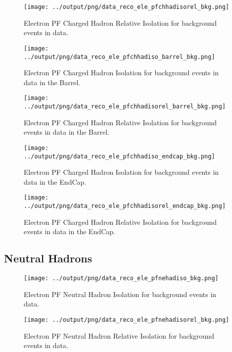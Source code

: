 \documentclass[11pt]{book}
\begin{document}
\begin{figure}[htb]
\centering
\texttt{[image: ../output/png/data\_reco\_ele\_pfchhadisorel\_bkg.png]}
\caption{Electron PF Charged Hadron Relative Isolation for background events in data.}
\label{fig:data_ele_pfchhadisorel_bkg}
\end{figure}

\begin{figure}[htb]
\centering
\texttt{[image: ../output/png/data\_reco\_ele\_pfchhadiso\_barrel\_bkg.png]}
\caption{Electron PF Charged Hadron Isolation for background events in data in the Barrel.}
\label{fig:data_ele_pfchhadiso_barrel_bkg}
\end{figure}

\begin{figure}[htb]
\centering
\texttt{[image: ../output/png/data\_reco\_ele\_pfchhadisorel\_barrel\_bkg.png]}
\caption{Electron PF Charged Hadron Relative Isolation for background events in data in the Barrel.}
\label{fig:data_ele_pfchhadisorel_barrel_bkg}
\end{figure}

\begin{figure}[htb]
\centering
\texttt{[image: ../output/png/data\_reco\_ele\_pfchhadiso\_endcap\_bkg.png]}
\caption{Electron PF Charged Hadron Isolation for background events in data in the EndCap.}
\label{fig:data_ele_pfchhadiso_endcap_bkg}
\end{figure}

\begin{figure}[htb]
\centering
\texttt{[image: ../output/png/data\_reco\_ele\_pfchhadisorel\_endcap\_bkg.png]}
\caption{Electron PF Charged Hadron Relative Isolation for background events in data in the EndCap.}
\label{fig:data_ele_pfchhadisorel_endcap_bkg}
\end{figure}
\clearpage

\subsection{Neutral Hadrons}
\begin{figure}[htb]
\centering
\texttt{[image: ../output/png/data\_reco\_ele\_pfnehadiso\_bkg.png]}
\caption{Electron PF Neutral Hadron Isolation for background events in data.}
\label{fig:data_ele_pfnehadiso_bkg}
\end{figure}

\begin{figure}[htb]
\centering
\texttt{[image: ../output/png/data\_reco\_ele\_pfnehadisorel\_bkg.png]}
\caption{Electron PF Neutral Hadron Relative Isolation for background events in data.}
\label{fig:data_ele_pfnehadisorel_bkg}
\end{figure}
\end{document}
